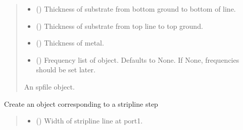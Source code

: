 \documentclass[letterpaper,10pt,english]{sphinxmanual}
\begin{document}
\begin{fulllineitems}
\begin{fulllineitems}
\begin{quote}
\begin{description}
\begin{itemize}
\item {} 
\sphinxAtStartPar
{} () \textendash{} Thickness of substrate from bottom ground to bottom of line.

\item {} 
\sphinxAtStartPar
{} () \textendash{} Thickness of substrate from top line to top ground.

\item {} 
\sphinxAtStartPar
{} () \textendash{} Thickness of metal.

\item {} 
\sphinxAtStartPar
{} (\sphinxstyleliteralemphasis{\sphinxupquote{, }}) \textendash{} Frequency list of object. Defaults to None. If None, frequencies should be set later.

\end{itemize}

\sphinxAtStartPar
An spfile object.

\sphinxAtStartPar
{\hyperref[\detokenize{touchstone:touchstone.spfile}]{}}

\end{description}\end{quote}

\end{fulllineitems}


\begin{fulllineitems}
\label{\detokenize{touchstone:touchstone.spfile.striplinestep}}
\pysigstartsignatures
{}
\pysigstopsignatures
\sphinxAtStartPar
Create an  object corresponding to a stripline step
\begin{quote}\begin{description}
\begin{itemize}
\item {} 
\sphinxAtStartPar
{} () \textendash{} Width of stripline line at port\sphinxhyphen{}1.


\end{itemize}
\end{description}
\end{quote}
\end{fulllineitems}
\end{fulllineitems}
\end{document}

